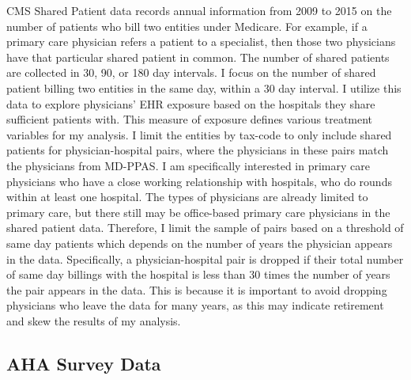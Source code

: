 \documentclass[11pt]{article}
\begin{document}
CMS Shared Patient data records annual information from 2009 to 2015 on the number of patients who bill two entities under Medicare. For example, if a primary care physician refers a patient to a specialist, then those two physicians have that particular shared patient in common. The number of shared patients are collected in 30, 90, or 180 day intervals. I focus on the number of shared patient billing two entities in the same day, within a 30 day interval. I utilize this data to explore physicians' EHR exposure based on the hospitals they share sufficient patients with. This measure of exposure defines various treatment variables for my analysis. I limit the entities by tax-code to only include shared patients for physician-hospital pairs, where the physicians in these pairs match the physicians from MD-PPAS. I am specifically interested in primary care physicians who have a close working relationship with hospitals, who do rounds within at least one hospital. The types of physicians are already limited to primary care, but there still may be office-based primary care physicians in the shared patient data. Therefore, I limit the sample of pairs based on a threshold of same day patients which depends on the number of years the physician appears in the data. Specifically, a physician-hospital pair is dropped if their total number of same day billings with the hospital is less than 30 times the number of years the pair appears in the data. This is because it is important to avoid dropping physicians who leave the data for many years, as this may indicate retirement and skew the results of my analysis.

\subsection{AHA Survey Data}
\end{document}
